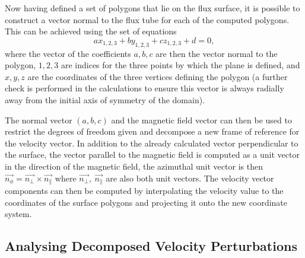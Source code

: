 Now having defined a set of polygons that lie on the flux surface, it is possible to construct a vector normal to the flux tube for each of the computed polygons.
 This can be achieved using the set of equations
\begin{equation}
	ax_{1,2,3}+by_{1,2,3}+cz_{1,2,3}+d=0,
\end{equation}
where the vector of the coefficients $a,b,c$ are then the vector normal to the polygon, $1, 2, 3$ are indices for the three points by which the plane is defined, and $x,y,z$ are the coordinates of the three vertices defining the polygon (a further check is performed in the calculations to ensure this vector is always radially away from the initial axis of symmetry of the domain).

The normal vector $(a,b,c)$ and the magnetic field vector can then be used to restrict the degrees of freedom given and decompose a new frame of reference for the velocity vector.
 In addition to the already calculated vector perpendicular to the surface, the vector parallel to the magnetic field is computed as a unit vector in the direction of the magnetic field, the azimuthal unit vector is then $\vec{n_\phi}= \vec{n_\perp} \times \vec{n_\parallel}$ where $\vec{n_\perp},\ \vec{n_\parallel} $ are also both unit vectors. 
 The velocity vector components can then be computed by interpolating the velocity value to the coordinates of the surface polygons and projecting it onto the new coordinate system.

\subsection{Analysing Decomposed Velocity Perturbations}\label{sec:results}

